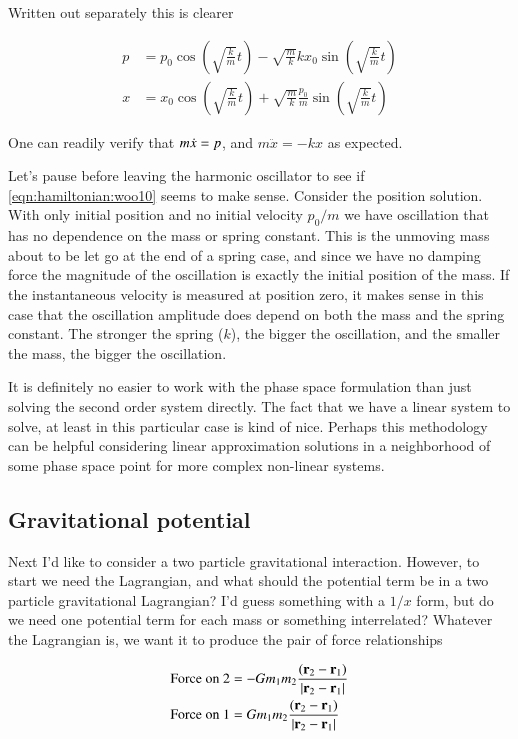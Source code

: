 Written out separately this is clearer

\begin{align}\label{eqn:hamiltonian:woo10}
p &= p_0 \cos\left(\sqrt{\frac{k}{m}} t\right) - \sqrt{\frac{m}{k}} k x_0 \sin\left(\sqrt{\frac{k}{m}} t\right) \\
x &= x_0 \cos\left(\sqrt{\frac{k}{m}} t\right) + \sqrt{\frac{m}{k}} \frac{p_0}{m} \sin\left(\sqrt{\frac{k}{m}} t\right)
\end{align}

One can readily verify that $m \dot{x} = p$, and $m \ddot{x} = -k x$ as expected.

Let's pause before leaving the harmonic oscillator to see if \ref{eqn:hamiltonian:woo10} seems to make sense.  Consider the position solution.  With only initial position and no initial velocity $p_0/m$ we have oscillation that has no dependence on the mass or spring constant.  This is the unmoving mass about to be let go at the end of a spring case, and since we have no damping force the magnitude of the oscillation is exactly the initial position of the mass.  If the instantaneous velocity is measured at position zero, it makes sense in this case that the oscillation amplitude does depend on both the mass and the spring constant.  The stronger the spring ($k$), the bigger the oscillation, and the smaller the mass, the bigger the oscillation.

It is definitely no easier to work with the phase space formulation than just solving the second order system directly.  The fact that we have a linear system to solve, at least in this particular case is kind of nice.  Perhaps this methodology can be helpful considering linear approximation solutions in a neighborhood of some phase space point for more complex non-linear systems.


\subsection{Gravitational potential}

Next I'd like to consider a two particle gravitational interaction.  However, to start we need the Lagrangian, and what should the potential term be in a two particle gravitational Lagrangian?  I'd guess something with a $1/x$ form, but do we need one potential term for each mass or something interrelated?  Whatever the Lagrangian is, we want it to produce the pair of force relationships

\begin{align}\label{eqn:hamiltonian:moo1}
\text{Force on 2} &= - G m_1 m_2 \frac{(\mathbf{r}_2 - \mathbf{r}_1)}{\left\lvert{\mathbf{r}_2 - \mathbf{r}_1}\right\rvert} \\
\text{Force on 1} &= G m_1 m_2 \frac{(\mathbf{r}_2 - \mathbf{r}_1)}{\left\lvert{\mathbf{r}_2 - \mathbf{r}_1}\right\rvert}
\end{align}

